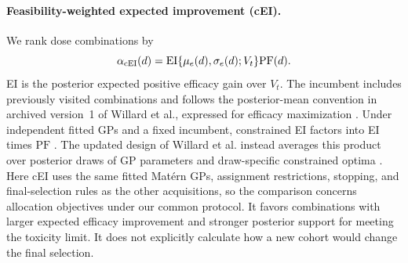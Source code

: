 \documentclass[11pt]{article}
\newcommand{\rev}[1]{{#1}}
\newcommand{\PF}{\mathrm{PF}}
\begin{document}
\paragraph{Feasibility-weighted expected improvement (cEI).} \rev{We rank dose combinations by}
\begin{equation}\label{eq:cei}
\alpha_{\rm cEI}(d)=\mathrm{EI}\{\mu_e(d),\sigma_e(d);\rev{V_t}\}\PF(d).
\end{equation}
\rev{EI is the posterior expected positive efficacy gain over $V_t$. The incumbent includes previously visited combinations and follows the posterior-mean convention in archived version~1 of Willard et al., expressed for efficacy maximization} \citep{willardobd}. \rev{Under independent fitted GPs and a fixed incumbent, constrained EI factors into EI times $\PF$} \citep{gardner2014,gelbart2014,letham2019}. \rev{The updated design of Willard et al. instead averages this product over posterior draws of GP parameters and draw-specific constrained optima} \citep{willardobd2026}. \rev{Here cEI uses the same fitted Mat\'ern GPs, assignment restrictions, stopping, and final-selection rules as the other acquisitions, so the comparison concerns allocation objectives under our common protocol.} It favors combinations with larger expected efficacy improvement and stronger posterior support for meeting the toxicity limit. It does not explicitly calculate how a new cohort would change the final selection.
\end{document}
